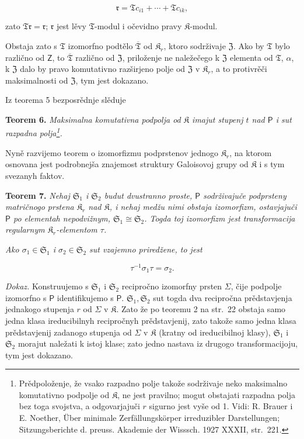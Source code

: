 \documentclass[11pt]{article}
\newcommand{\srcfn}[2]{\footnote{#2}}
\newcommand{\foreign}[1]{#1}
\begin{document}
\[
\mathfrak r=\mathfrak T c_{i1}+\cdots+\mathfrak T c_{ik},
\]

zato \(\mathfrak T\mathfrak r=\mathfrak r\); \(\mathfrak r\) jest lěvy \(\mathfrak T\)-modul i očevidno pravy \(\mathfrak K\)-modul.

Obstaja zato s \(\mathfrak T\) izomorfno podtělo \(\overline{\mathfrak T}\) od \(\mathfrak K_r\), ktoro sodrživaje \(\mathfrak Z\). Ako by \(\mathfrak T\) bylo različno od \(\mathsf{Z}\), to \(\overline{\mathfrak T}\) različno od \(\mathfrak Z\), priloženje ne naležečego k \(\mathfrak Z\) elementa od \(\mathfrak T\), \(\alpha\), k \(\mathfrak Z\) dalo by pravo komutativno razširjeno polje od \(\mathfrak Z\) v \(\mathfrak K_r\), a to protivrěči maksimalnosti od \(\mathfrak Z\), tym jest dokazano.

Iz teorema 5 bezposrědnje slěduje

\textbf{Teorem 6.} \emph{Maksimalna komutativna podpolja od \(\mathfrak K\) imajut stupenj \(t\) nad \(\mathsf P\) i sut razpadna polja\srcfn{1}{Prědpoloženje, že vsako razpadno polje takože sodrživaje neko maksimalno komutativno podpolje od \(\mathfrak K\), ne jest pravilno; mogut obstajati razpadna polja bez toga svojstva, a odgovarjajuči \(r\) sigurno jest vyše od 1. Vidi: \foreign{R. Brauer} i \foreign{E. Noether}, \foreign{Über minimale Zerfällungskörper irreduzibler Darstellungen; Sitzungsberichte d. preuss. Akademie der Wisssch. 1927 XXXII, str.~221.}}.}

Nyně razvijemo teorem o izomorfizmu podprstenov jednogo \(\mathfrak K_r\), na ktorom osnovana jest podrobnejša znajemost struktury Galoisovoj grupy od \(\mathfrak K\) i s tym svezanyh faktov.

\textbf{Teorem 7.} \emph{Nehaj \(\mathfrak S_1\) i \(\mathfrak S_2\) budut dvustranno proste, \(\mathsf P\) sodrživajuče podprsteny matričnogo prstena \(\mathfrak K_r\) nad \(\mathfrak K\), i nehaj medžu nimi obstaja izomorfizm, ostavjajuči \(\mathsf P\) po elementah nepodvižnym, \(\mathfrak S_1\cong\mathfrak S_2\). Togda toj izomorfizm jest transformacija regularnym \(\mathfrak K_r\)-elementom \(\tau\).}

\emph{Ako \(\sigma_1\in\mathfrak S_1\) i \(\sigma_2\in\mathfrak S_2\) sut vzajemno priredžene, to jest}

\[
\tau^{-1}\sigma_1\tau=\sigma_2.
\]

\emph{Dokaz.} Konstruujemo s \(\mathfrak S_1\) i \(\mathfrak S_2\) recipročno izomorfny prsten \(\Sigma\), čije podpolje izomorfno s \(\mathsf P\) identifikujemo s \(\mathsf P\). \(\mathfrak S_1,\mathfrak S_2\) sut togda dva recipročna prědstavjenja jednakogo stupenja \(r\) od \(\Sigma\) v \(\mathfrak K\). Zato že po teoremu 2 na str.~22 obstaja samo jedna klasa ireducibilnyh recipročnyh prědstavjenij, zato takože samo jedna klasa prědstavjenij zadanogo stupenja od \(\Sigma\) v \(\mathfrak K\) (kratny od ireducibilnoj klasy), \(\mathfrak S_1\) i \(\mathfrak S_2\) morajut naležati k istoj klase; zato jedno nastava iz drugogo transformacijoju, tym jest dokazano.
\end{document}
